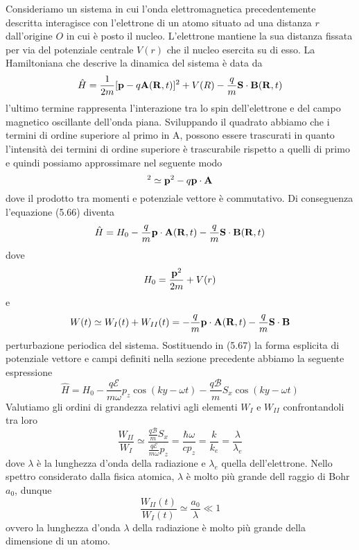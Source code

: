 Consideriamo un sistema in cui l'onda elettromagnetica precedentemente descritta interagisce con  l'elettrone di un atomo situato ad una distanza $r$ dall'origine $O$ in cui \`e posto il nucleo.  L'elettrone mantiene la sua distanza fissata per via del potenziale centrale $V(r)$ che il nucleo esercita su di esso. La Hamiltoniana che descrive la dinamica del sistema \`e data da
\begin{equation}
	\hat{H} = \frac{1}{2m}[\bold{p}-q\bold{A}(\bold{R},t)]^2 + V(R)-\frac{q}{m}\bold{S} \cdot \bold{B}(\bold{R},t)
\end{equation}
l'ultimo termine rappresenta l'interazione tra lo spin dell'elettrone e del campo magnetico oscillante dell'onda piana. Sviluppando il quadrato abbiamo che i termini di ordine superiore al primo in A, possono essere trascurati in quanto l'intensit\`a dei termini di ordine superiore \`e trascurabile rispetto a quelli di primo e quindi possiamo approssimare nel seguente modo 
\begin{equation*}
	[\bold{p} - q \bold{A}]^2 \simeq \bold{p}^2 - q \bold{p} \cdot \bold{A} 
\end{equation*}
dove il prodotto tra momenti e potenziale vettore \`e commutativo.
Di conseguenza l'equazione (5.66) diventa
\begin{equation}
	\hat{H} = H_0 - \frac{q}{m} \bold{p} \cdot \bold{A}(\bold{R},t) - \frac{q}{m}\bold{S} \cdot \bold{B}(\bold{R},t)
\end{equation}
dove 
\begin{equation*}
	H_0 = \frac{\bold{p}^2}{2m} + V(r)
\end{equation*}
e 
\begin{equation*}
	W(t) \simeq W_{I}(t) + W_{II}(t)  = - \frac{q}{m} \bold{p} \cdot \bold{A}(\bold{R},t) - \frac{q}{m}\bold{S} \cdot \bold{B}
\end{equation*}
perturbazione periodica del sistema. Sostituendo in (5.67) la forma esplicita di potenziale vettore e campi definiti nella sezione precedente abbiamo la seguente espressione
\begin{equation*}
	\hat{H} = H_0 - \frac{q \mathcal{E}}{m\omega}p_{z}\cos(ky-\omega t) - \frac{q \mathcal{B}}{m}S_x \cos(ky- \omega t)
\end{equation*}
Valutiamo gli ordini di grandezza relativi agli elementi $W_{I}$ e $W_{II}$ confrontandoli tra loro
\begin{equation*}
	\frac{W_{II}}{{W}_{I}} \simeq \frac{\frac{q \mathcal{B}}{m}S_{x}}{\frac{q\mathcal{E}}{m \omega}p_z} = \frac{\hbar \omega}{c p_z} = \frac{k}{k_e } = \frac{\lambda}{\lambda_e} 
\end{equation*}
dove $\lambda $ \`e la lunghezza d'onda della radiazione e $\lambda_e$ quella dell'elettrone. Nello spettro considerato dalla fisica atomica, $\lambda $ \`e molto pi\`u grande dell raggio di Bohr $a_0$, dunque
\begin{equation}
	\frac{W_{II}(t)}{W_{I}(t)}  \simeq  \frac{a_0}{\lambda} \ll 1
\end{equation}
ovvero la lunghezza d'onda $\lambda$ della radiazione \`e molto pi\`u grande della dimensione di un atomo.

